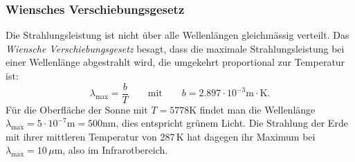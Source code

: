 \subsubsection{Wiensches Verschiebungsgesetz}
Die Strahlungsleistung ist nicht über alle Wellenlängen gleichmässig
verteilt.
Das {\em Wiensche Verschiebungsgesetz} besagt, dass die maximale
Strahlungsleistung bei einer Wellenlänge abgestrahlt wird,
die umgekehrt proportional zur Temperatur ist:
\begin{equation}
\lambda_{\text{max}}
=
\frac{b}{T}
\qquad\text{mit}\qquad
b=2.897\cdot10^{-3}\text{m}\cdot\text{K}.
\end{equation}
Für die Oberfläche der Sonne mit $T=5778\text{K}$ findet man die
Wellenlänge
$\lambda_{\text{max}}=5\cdot10^{-7}\text{m} = 500\text{nm}$,
dies entspricht grünem Licht.
Die Strahlung der Erde mit ihrer mittleren Temperatur von 287\,K
hat dagegen ihr Maximum bei $\lambda_{\text{max}}=10\,\mu\text{m}$,
also im Infrarotbereich.

